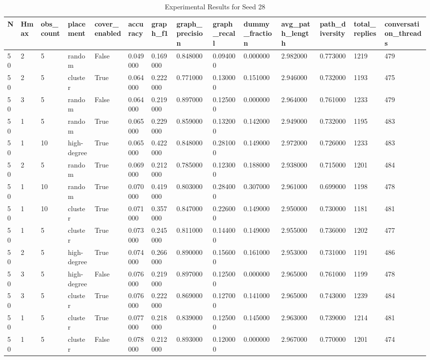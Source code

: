 \begin{table}
\caption{Experimental Results for Seed 28}
\label{tab:results_seed_28}
\begin{tabular}{llllllllllllll}
\toprule
N & Hmax & obs_count & placement & cover_enabled & accuracy & graph_f1 & graph_precision & graph_recall & dummy_fraction & avg_path_length & path_diversity & total_replies & conversation_threads \\
\midrule
50 & 2 & 5 & random & False & 0.049000 & 0.169000 & 0.848000 & 0.094000 & 0.000000 & 2.982000 & 0.773000 & 1219 & 479 \\
50 & 2 & 5 & cluster & True & 0.064000 & 0.222000 & 0.771000 & 0.130000 & 0.151000 & 2.946000 & 0.732000 & 1193 & 475 \\
50 & 3 & 5 & random & False & 0.064000 & 0.219000 & 0.897000 & 0.125000 & 0.000000 & 2.964000 & 0.761000 & 1233 & 479 \\
50 & 1 & 5 & random & True & 0.065000 & 0.229000 & 0.859000 & 0.132000 & 0.142000 & 2.949000 & 0.732000 & 1195 & 483 \\
50 & 1 & 10 & high-degree & True & 0.065000 & 0.422000 & 0.848000 & 0.281000 & 0.149000 & 2.972000 & 0.726000 & 1233 & 483 \\
50 & 2 & 5 & random & True & 0.069000 & 0.212000 & 0.785000 & 0.123000 & 0.188000 & 2.938000 & 0.715000 & 1201 & 484 \\
50 & 1 & 10 & random & True & 0.070000 & 0.419000 & 0.803000 & 0.284000 & 0.307000 & 2.961000 & 0.699000 & 1198 & 478 \\
50 & 1 & 10 & cluster & True & 0.071000 & 0.357000 & 0.847000 & 0.226000 & 0.149000 & 2.950000 & 0.730000 & 1181 & 481 \\
50 & 1 & 5 & cluster & True & 0.073000 & 0.245000 & 0.811000 & 0.144000 & 0.149000 & 2.955000 & 0.736000 & 1202 & 477 \\
50 & 2 & 5 & high-degree & True & 0.074000 & 0.266000 & 0.890000 & 0.156000 & 0.161000 & 2.953000 & 0.731000 & 1191 & 486 \\
50 & 3 & 5 & high-degree & False & 0.076000 & 0.219000 & 0.897000 & 0.125000 & 0.000000 & 2.965000 & 0.761000 & 1199 & 478 \\
50 & 3 & 5 & cluster & True & 0.076000 & 0.222000 & 0.869000 & 0.127000 & 0.141000 & 2.965000 & 0.743000 & 1239 & 484 \\
50 & 1 & 5 & cluster & True & 0.077000 & 0.218000 & 0.839000 & 0.125000 & 0.145000 & 2.963000 & 0.739000 & 1214 & 481 \\
50 & 1 & 5 & cluster & False & 0.078000 & 0.212000 & 0.893000 & 0.120000 & 0.000000 & 2.967000 & 0.770000 & 1201 & 474 \\

\end{tabular}
\end{table}
